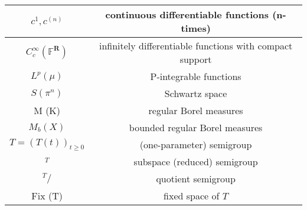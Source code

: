 \begin{tabular}{|c|c|}
\hline $c^{1}, c^{(n)}$ & continuous differentiable functions (n-times) \\
\hline $C_{c}^{\infty}\left(\mathbb{F}^{\mathbf{R}}\right)$ & infinitely differentiable functions with compact support \\
\hline $L^{p}(\mu)$ & P-integrable functions \\
\hline $S\left(\pi^{n}\right)$ & Schwartz space \\
\hline M (K) & regular Borel measures \\
\hline $M_{b}(X)$ & bounded regular Borel measures \\
\hline $T=(T(t))_{t \geq 0}$ & (one-parameter) semigroup \\
\hline ${ }^{T}$ & subspace (reduced) semigroup \\
\hline ${ }^{T} /$ & quotient semigroup \\
\hline Fix (T) & fixed space of $T$ \\
\hline
\end{tabular}
